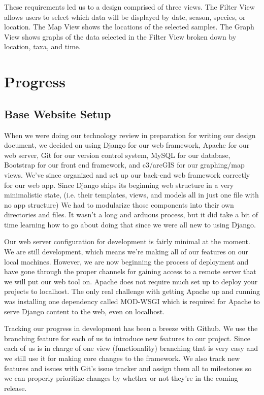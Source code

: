 \documentclass[10pt,draftclsnofoot,onecolumn]{IEEEtran}
\begin{document}
These requirements led us to a design comprised of three views.
The Filter View allows users to select which data will be displayed by date, season, species, or location.
The Map View shows the locations of the selected samples.
The Graph View shows graphs of the data selected in the Filter View broken down by location, taxa, and time.


\section{Progress}

\subsection{Base Website Setup} %
When we were doing our technology review in preparation for writing our design document, we decided on using Django for our web framework, Apache for our web server, Git for our version control system, MySQL for our database, Bootstrap for our front end framework, and c3/arcGIS for our graphing/map views.
We’ve since organized and set up our back-end web framework correctly for our web app.
Since Django ships its beginning web structure in a very minimalistic state, (i.e. their templates, views, and models all in just one file with no app structure) We had to modularize those components into their own directories and files.
It wasn’t a long and arduous process, but it did take a bit of time learning how to go about doing that since we were all new to using Django.

Our web server configuration for development is fairly minimal at the moment.
We are still development, which means we’re making all of our features on our local machines.
However, we are now beginning the process of deployment and have gone through the proper channels for gaining access to a remote server that we will put our web tool on.
Apache does not require much set up to deploy your projects to localhost.
The only real challenge with getting Apache up and running was installing one dependency called MOD-WSGI which is required for Apache to serve Django content to the web, even on localhost.

Tracking our progress in development has been a breeze with Github.
We use the branching feature for each of us to introduce new features to our project.
Since each of us is in charge of one view (functionality) branching that is very easy and we still use it for making core changes to the framework.
We also track new features and issues with Git’s issue tracker and assign them all to milestones so we can properly prioritize changes by whether or not they’re in the coming release.
\end{document}
